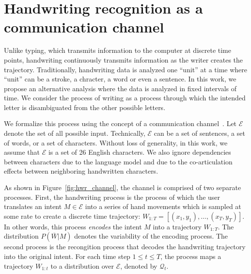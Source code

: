 \documentclass{sigchi}
\begin{document}
\section{Handwriting recognition as a communication channel}
\label{sec:channel}

Unlike typing, which transmits information to the computer at discrete
time points, handwriting continuously transmits information as the
writer creates the trajectory. Traditionally, handwriting data is
analyzed one ``unit'' at a time where ``unit'' can be a stroke, a
chracter, a word or even a sentence. In this work, we propose an
alternative analysis where the data is analyzed in fixed intervals of
time. We consider the process of writing as a process through which
the intended letter is disambiguated from the other possible letters.

\newcommand{\intent}{M}
\newcommand{\intentSet}{\mathcal{E}}
\newcommand{\intentDist}{\mathcal{M}}
\newcommand{\pred}[1]{\mathcal{Q}_{#1}}
\newcommand{\predFinal}{\pred{\mathrm{final}}}
\newcommand{\writing}[1]{W_{1:{#1}}}
\newcommand{\writingVec}{\overline{W}}
\newcommand{\writingDist}{P(\writingVec | \intent)}
\newcommand{\tFinal}{T}
\newcommand{\expectedDuration}{\mathbb{E} \left[\tFinal\right]}
\newcommand{\condEntropy}{H(\predFinal | \intent)}

We formalize this process using the concept of a communication
channel~\cite{Shannon1948}.  Let $\intentSet$ denote the set of all
possible input. Technically, $\intentSet$ can be a set of sentences, a
set of words, or a set of characters. Without loss of generality, in
this work, we assume that $\intentSet$ is a set of 26 English
characters. We also ignore dependencies between characters due to
the language model and due to the co-articulation effects between
neighboring handwritten characters.

As shown in Figure~\ref{fig:hwr_channel}, the channel is comprised of
two separate processes. First, the handwriting process is the process
of which the user translates an intent $\intent \in \intentSet$ into a
series of hand movements which is sampled at some rate to create a
discrete time trajectory: $\writing{T} = \left[ (x_1,y_1), \ldots,
  (x_T,y_T) \right]$. In other words, this process {\em encodes} the
intent $\intent$ into a trajectory $\writing{T}$. The distribution
$\writingDist$ denotes the variability of the encoding process. The
second process is the recongition process that decodes the handwriting
trajectory into the original intent. For each time step $1 \le t \le
T$, the process maps a trajectory $\writing{t}$ to a distribution over
$\intentSet$, denoted by $\pred{t}$.
\end{document}
